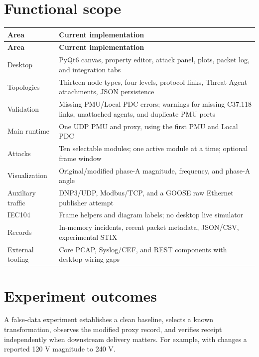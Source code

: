\section*{Functional scope}
\begingroup
\fontsize{8.7}{11.8}\selectfont
\setlength{\tabcolsep}{5pt}
\renewcommand{\arraystretch}{1.23}
\begin{longtable}{@{}>{\raggedright\arraybackslash}p{}>{\raggedright\arraybackslash}p{}@{}}
\rowcolor{navy} \color{white}\bfseries Area & \color{white}\bfseries Current implementation \\
\endfirsthead
\rowcolor{navy} \color{white}\bfseries Area & \color{white}\bfseries Current implementation \\
\endhead
\endfoot
\rowcolor{pale}
Desktop & PyQt6 canvas, property editor, attack panel, plots, packet log, and integration tabs \\
Topologies & Thirteen node types, four levels, protocol links, Threat Agent attachments, JSON persistence \\
\rowcolor{pale}
Validation & Missing PMU/Local PDC errors; warnings for missing C37.118 links, unattached agents, and duplicate PMU ports \\
Main runtime & One UDP PMU and proxy, using the first PMU and Local PDC \\
\rowcolor{pale}
Attacks & Ten selectable modules; one active module at a time; optional frame window \\
Visualization & Original/modified phase-A magnitude, frequency, and phase-A angle \\
\rowcolor{pale}
Auxiliary traffic & DNP3/UDP, Modbus/TCP, and a GOOSE raw Ethernet publisher attempt \\
IEC104 & Frame helpers and diagram labels; no desktop live simulator \\
\rowcolor{pale}
Records & In-memory incidents, recent packet metadata, JSON/CSV, experimental STIX \\
External tooling & Core PCAP, Syslog/CEF, and REST components with desktop wiring gaps \\
\end{longtable}
\endgroup

\section*{Experiment outcomes}
A false-data experiment establishes a clean baseline, selects a known transformation, observes the modified proxy record, and verifies receipt independently when downstream delivery matters. For example,  with  changes a reported 120 V magnitude to 240 V.


